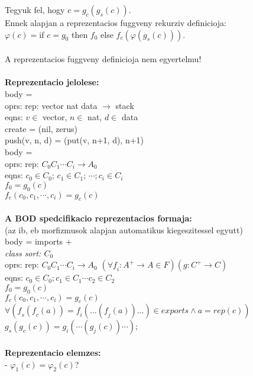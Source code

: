 \documentclass[a4paper,10pt]{article}
\begin{document}
Tegyuk fel, hogy $c=g_c(g_s(c))$.\\
Ennek alapjan a reprezentacios fuggveny rekurziv definicioja:\\
$\varphi(c)=$if $c = g_0$ then $f_0$ else $f_c(\varphi(g_s(c)))$.\\ \\
A reprezentacios fuggveny definicioja nem egyertelmu!\\ \\
\textbf{Reprezentacio jelolese:}\\
body = \\
\indent oprs: rep: vector nat data $\to$ stack\\
\indent eqns: $v\in$ vector, $n\in$ nat, $d\in$ data\\
\indent \indent create = (nil, zerus)\\
\indent \indent push(v, n, d) = (put(v, n+1, d), n+1)\\
body = \\
\indent oprs: rep: $C_0 C_1 \cdots C_i \to A_0$\\
\indent eqns: $c_0 \in C_0$; $c_1 \in C_1$; $\cdots; c_i \in C_i$\\
\indent \indent $f_0=g_0(c)$\\
\indent \indent $f_c(c_0, c_1, \cdots, c_i) = g_c(c)$\\ \\
\textbf{A BOD spedcifikacio reprezentacios formaja:}\\
(az ib, eb morfizmusok alapjan automatikus kiegeszitessel egyutt)\\
body = imports +\\
\textit{class sort: $\mathit{C_0}$}\\
oprs: rep: $C_0 C_1 \cdots C_i \to A_0$ $\mathit{(\forall f_i: A^+ \to A \in F)(g: C^+ \to C)}$\\
\indent eqns: $c_0\in C_0; c_1\in C_1 \cdots c_2\in C_2$\\
\indent \indent $f_0 = g_0(c)$\\
\indent \indent $f_c(c_0, c_1, \cdots, c_i) = g_c(c)$\\
\indent \indent $\mathit{\forall(f_s(f_c(a)) = f_i(...(f_j(a))...) \in exports \wedge a=rep(c))}$\\
\indent \indent $\mathit{g_s(g_c(c)) = g_i(\cdots(g_j(c))\cdots)}$;\\ \\
\textbf{Reprezentacio elemzes:}\\
- $\varphi_1(c) = \varphi_2(c)$?\\
\end{document}
